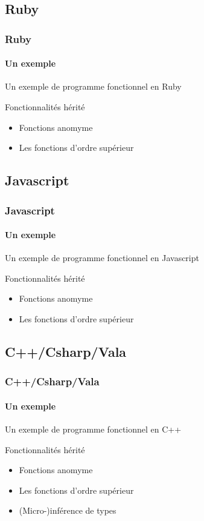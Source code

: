\documentclass[t,12pt]{beamer}
\begin{document}
\subsection{Ruby}
\begin{frame}
  \frametitle{Ruby}
  \framesubtitle{Un exemple}

  \begin{exampleblock}{Un exemple de programme fonctionnel en Ruby}
    \rubyExample
  \end{exampleblock}

  \begin{block}{Fonctionnalités hérité}
    \begin{itemize}
      \item Fonctions anomyme
      \item Les fonctions d'ordre supérieur
    \end{itemize}
  \end{block}
\end{frame}

\subsection{Javascript}
\begin{frame}
  \frametitle{Javascript}
  \framesubtitle{Un exemple}

  \begin{exampleblock}{Un exemple de programme fonctionnel en Javascript}
    \jsExample
  \end{exampleblock}

  \begin{block}{Fonctionnalités hérité}
    \begin{itemize}
      \item Fonctions anomyme
      \item Les fonctions d'ordre supérieur
    \end{itemize}
  \end{block}
\end{frame}

\subsection{C++/Csharp/Vala}
\begin{frame}
  \frametitle{C++/Csharp/Vala}
  \framesubtitle{Un exemple}

  \begin{exampleblock}{Un exemple de programme fonctionnel en C++}
    \valaExample
  \end{exampleblock}

  \begin{block}{Fonctionnalités hérité}
    \begin{itemize}
      \item Fonctions anomyme
      \item Les fonctions d'ordre supérieur
      \item (Micro-)inférence de types
    \end{itemize}
  \end{block}
\end{frame}
\end{document}
